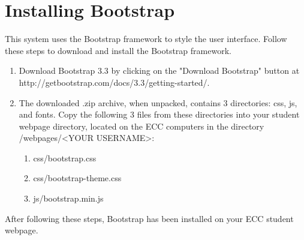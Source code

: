 \documentclass{article}
\begin{document}
\section{Installing Bootstrap}
\par This system uses the Bootstrap framework to style the user interface.
Follow these steps to download and install the Bootstrap framework.
\begin{enumerate}
\item Download Bootstrap 3.3 by clicking on the "Download Bootstrap" button at
\newline http://getbootstrap.com/docs/3.3/getting-started/.
\item The downloaded .zip archive, when unpacked, contains 3 directories: css,
js, and fonts. Copy the following 3 files from these directories into your student webpage directory, located on
the ECC computers in the directory /webpages/\textless YOUR USERNAME\textgreater :
\begin{enumerate}
\item css/bootstrap.css
\item css/bootstrap-theme.css
\item js/bootstrap.min.js
\end{enumerate}
\end{enumerate}
\par After following these steps, Bootstrap has been installed on your ECC
student webpage.
\end{document}
